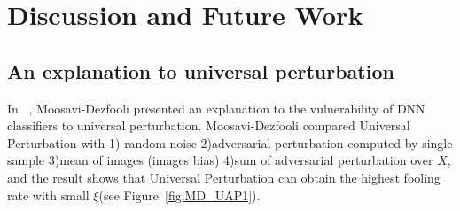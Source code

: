 \documentclass{article}
\begin{document}
\section{Discussion and Future Work}
\subsection{An explanation to universal perturbation}
In ~\cite{Moosavi-Dezfooli_2017_CVPR}, Moosavi-Dezfooli presented an explanation to the vulnerability of DNN classifiers to universal perturbation. Moosavi-Dezfooli compared Universal Perturbation with 1) random noise 2)adversarial perturbation computed by single sample 3)mean of images (images bias) 4)sum of adversarial perturbation over $X$, and the result shows that Universal Perturbation can obtain the highest fooling rate with small $\xi$(see Figure~\ref{fig:MD_UAP1}).
\end{document}
